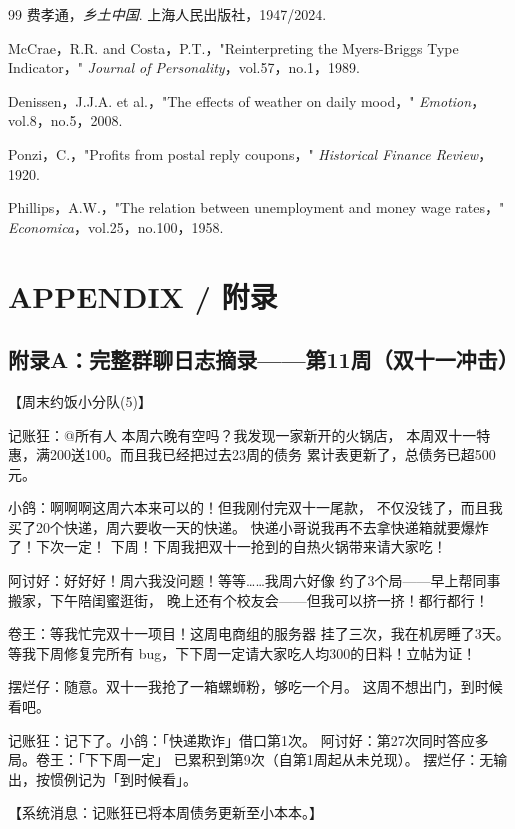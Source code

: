 \documentclass[journal]{IEEEtran}
\begin{document}
\begin{thebibliography}{99}
 费孝通，\textit{乡土中国}. 上海人民出版社，1947/2024.

 McCrae，R.R. and Costa，P.T.，"Reinterpreting the Myers-Briggs Type Indicator，" \textit{Journal of Personality}，vol.57，no.1，1989.

 Denissen，J.J.A. et al.，"The effects of weather on daily mood，" \textit{Emotion}，vol.8，no.5，2008.

 Ponzi，C.，"Profits from postal reply coupons，" \textit{Historical Finance Review}，1920.

 Phillips，A.W.，"The relation between unemployment and money wage rates，" \textit{Economica}，vol.25，no.100，1958.

\end{thebibliography}

\appendix
\section*{APPENDIX / 附录}
\label{sec:appendix}

\subsection*{附录A：完整群聊日志摘录——第11周（双十一冲击）}
\label{app:chat_week11}

\begin{chatbox}
【周末约饭小分队(5)】

记账狂：@所有人 本周六晚有空吗？我发现一家新开的火锅店，
本周双十一特惠，满200送100。而且我已经把过去23周的债务
累计表更新了，总债务已超500元。

小鸽：啊啊啊这周六本来可以的！但我刚付完双十一尾款，
不仅没钱了，而且我买了20个快递，周六要收一天的快递。
快递小哥说我再不去拿快递箱就要爆炸了！下次一定！
下周！下周我把双十一抢到的自热火锅带来请大家吃！

阿讨好：好好好！周六我没问题！等等……我周六好像
约了3个局——早上帮同事搬家，下午陪闺蜜逛街，
晚上还有个校友会——但我可以挤一挤！都行都行！

卷王：等我忙完双十一项目！这周电商组的服务器
挂了三次，我在机房睡了3天。等我下周修复完所有
bug，下下周一定请大家吃人均300的日料！立帖为证！

摆烂仔：随意。双十一我抢了一箱螺蛳粉，够吃一个月。
这周不想出门，到时候看吧。

记账狂：记下了。小鸽：「快递欺诈」借口第1次。
阿讨好：第27次同时答应多局。卷王：「下下周一定」
已累积到第9次（自第1周起从未兑现）。
摆烂仔：无输出，按惯例记为「到时候看」。

【系统消息：记账狂已将本周债务更新至小本本。】
\end{chatbox}
\end{document}
